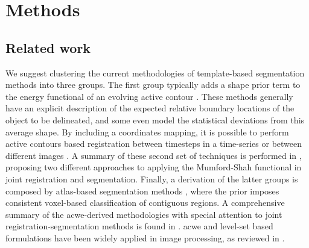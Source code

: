 \section{Methods}
\label{sec:methods}
%
\subsection{Related work}
\label{sec:methods_background}

We suggest clustering the
current methodologies of template-based segmentation methods into three groups.
The first group typically adds a shape prior term to the energy functional of
\citep{chan_level_2005,chen_using_2002,cremers_kernel_2006,gastaud_combining_2004,wyatt_map_2003,paragios_level_2003,yezzi_variational_2003,gorthi_segmentation_2009,pohl_unifying_2005,pohl_bayesian_2006,wang_joint_2006,guyader_combined_2011,besson_dream2s_2003,bertero_illposed_1988,cote_tractometer_2013}
an evolving active contour \citep{bresson_variational_2006, chan_level_2005,
chen_using_2002,cremers_kernel_2006,gastaud_combining_2004}.
These methods generally have an explicit description of the expected relative boundary
locations of the object to be delineated, and some even model the statistical deviations
from this average shape. By including a coordinates mapping, it is possible to perform
active contours based registration between timesteps in a time-series or between different
images \citep{bertalmio_morphing_2000,wyatt_map_2003,paragios_level_2003,vemuri_joint_2003,
yezzi_variational_2003}.
A summary of these second set of techniques is performed in \citep{droske_mumfordshah_2009},
proposing two different approaches to applying the Mumford-Shah \citep{mumford_optimal_1989}
functional in joint registration and segmentation. Finally, a derivation of the
latter groups is composed by atlas-based segmentation methods
\citep{gorthi_segmentation_2009,gorthi_active_2011,pohl_unifying_2005,
pohl_bayesian_2006,wang_joint_2006}, where the prior
imposes consistent voxel-based classification of contiguous regions.
A comprehensive summary of the \gls{acwe}-derived methodologies with special attention
to joint registration-segmentation methods is found in \citep{gorthi_active_2011}.
\Gls{acwe} and level-set based formulations have been widely applied in image
processing, as reviewed in \citep{suri_shape_2002}.

